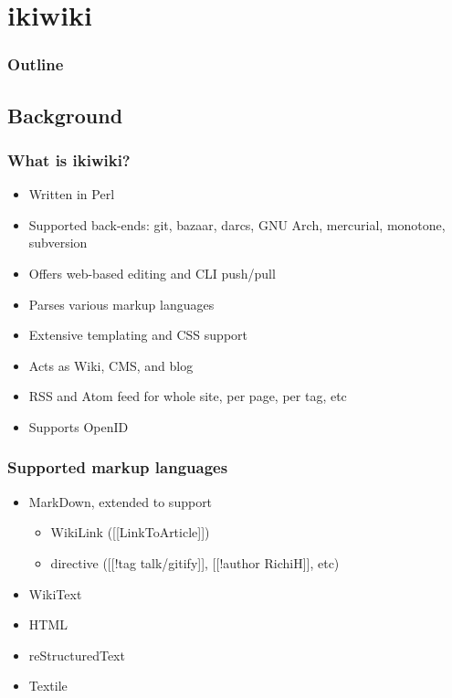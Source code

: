 \documentclass[t]{beamer}
\begin{document}
\section{ikiwiki}

\begin{frame}
	\frametitle{Outline}
	\tableofcontents[currentsection]
\end{frame}

\subsection{Background}

\begin{frame}
	\frametitle{What is ikiwiki?}
	\begin{itemize}
		\item Written in Perl
		\item Supported back-ends: git, bazaar, darcs, GNU Arch, mercurial, monotone, subversion
		\item Offers web-based editing and CLI push/pull
		\item Parses various markup languages
		\item Extensive templating and CSS support
		\item Acts as Wiki, CMS, and blog
		\item RSS and Atom feed for whole site, per page, per tag, etc
		\item Supports OpenID
	\end{itemize}
\end{frame}

\begin{frame}
	\frametitle{Supported markup languages}
	\begin{itemize}
		\item MarkDown, extended to support
		\begin{itemize}
			\item WikiLink ([[LinkToArticle]])
			\item directive ([[!tag talk/gitify]], [[!author RichiH]], etc)
		\end{itemize}
		\item WikiText
		\item HTML
		\item reStructuredText
		\item Textile
	\end{itemize}
\end{frame}
\end{document}
